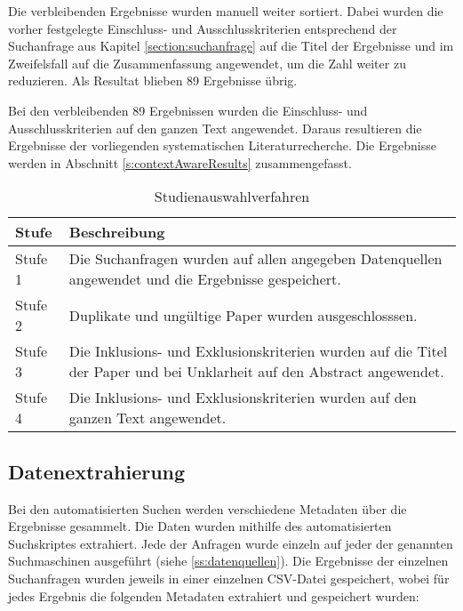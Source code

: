 \documentclass[conference,compsoc,ngerman]{IEEEtran}
\begin{document}
Die verbleibenden Ergebnisse wurden manuell weiter sortiert. Dabei wurden die vorher festgelegte Einschluss- und Ausschlusskriterien entsprechend der Suchanfrage aus Kapitel \ref{section:suchanfrage} auf die Titel der Ergebnisse und im Zweifelsfall auf die Zusammenfassung angewendet, um die Zahl weiter zu reduzieren. Als Resultat blieben 89 Ergebnisse übrig.

Bei den verbleibenden 89 Ergebnissen wurden die Einschluss- und Ausschlusskriterien auf den ganzen Text angewendet. Daraus resultieren die Ergebnisse der vorliegenden systematischen Literaturrecherche. Die Ergebnisse werden in Abschnitt \ref{s:contextAwareResults} zusammengefasst.

\begin{table}[h]
	\caption{Studienauswahlverfahren}
	\label{tabelle:auswahlverfahren}
\begin{tabular}{p{1cm}|p{6.5cm}}

	Stufe & Beschreibung \\
	\hline	
	Stufe 1 & Die Suchanfragen wurden auf allen angegeben Datenquellen angewendet und die Ergebnisse gespeichert.\\
	
	Stufe 2 & Duplikate und ungültige Paper wurden ausgeschlosssen.\\
	
	Stufe 3 & Die Inklusions- und Exklusionskriterien wurden auf die Titel der Paper und bei Unklarheit auf den Abstract angewendet. \\
	
	
	Stufe 4 & Die Inklusions- und Exklusionskriterien wurden auf den ganzen Text angewendet.
	
\end{tabular}
\end{table}


\subsection{Datenextrahierung}
Bei den automatisierten Suchen werden verschiedene Metadaten über die Ergebnisse gesammelt. Die Daten wurden mithilfe des automatisierten Suchskriptes extrahiert.
Jede der Anfragen wurde einzeln auf jeder der genannten Suchmaschinen ausgeführt (siehe \cref{ss:datenquellen}). Die Ergebnisse der einzelnen Suchanfragen wurden jeweils in einer einzelnen CSV-Datei gespeichert, wobei für jedes Ergebnis die folgenden Metadaten extrahiert und gespeichert wurden:
\end{document}
